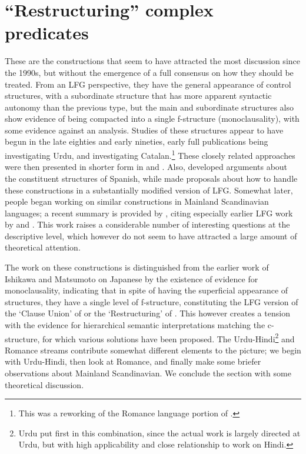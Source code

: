 \documentclass[output=paper,hidelinks]{langscibook}
\begin{document}
\section{``Restructuring'' complex predicates}
These are the constructions that seem to have attracted the most discussion since the 1990s,
but without the emergence of a full consensus on how they should be treated.  From an
LFG perspective, they have the general appearance of control structures, with
a subordinate structure that has more apparent syntactic autonomy than the previous type,
but the main and subordinate structures also show evidence of being compacted into a single f-structure
(monoclausality), with some evidence against an {\XCOMP} analysis.
Studies of these structures appear to have begun
in the late eighties and early nineties, early full publications being
\citet{Butt1993,Butt1995} investigating Urdu, and \citet{alsina1996the-role}
investigating Catalan.\footnote
 {This was a reworking of the Romance language portion of \citet{Alsina:PhD}.}
These closely related approaches were then presented in shorter form in \citet{Butt1997}
and \citet{Alsina1997}.
Also, \citet{Manning1992} developed arguments
about the constituent structures of Spanish, while
\citet{AndrewsManning1993,AndrewsManning1999} made
proposals about how to handle these constructions in a substantially modified version of LFG.
Somewhat later, people began working on similar constructions in Mainland Scandinavian
languages; a recent summary is provided by \citet{Lodrup2014}, citing especially earlier LFG
work by \citet{Nino1997} and \citet{Sells2004}.  This work raises a considerable number
of interesting questions at the descriptive level, which however do not seem to have
attracted a large amount of theoretical attention.

The work on these constructions is distinguished from the earlier work of Ishikawa and Matsumoto
on Japanese by the existence of evidence for monoclausality, indicating that in spite of having
the superficial appearance of {\XCOMP} structures, they have a single level of f-structure,
constituting the LFG version of the `Clause Union'
of \citet{AiPe83} or the `Restructuring' of \citet{Rizzi1978}.  This however
creates a tension with the evidence for hierarchical semantic
interpretations matching the c-structure, for which various solutions have been proposed.
The Urdu-Hindi\footnote
 {Urdu put first in this combination, since the actual work is largely directed
 at Urdu, but with high applicability and close relationship to work on Hindi.}
and Romance streams
contribute somewhat different elements to the picture; we begin with Urdu-Hindi, then look at
Romance, and finally make some briefer observations about Mainland Scandinavian. We conclude
the section with some theoretical discussion.
\end{document}

